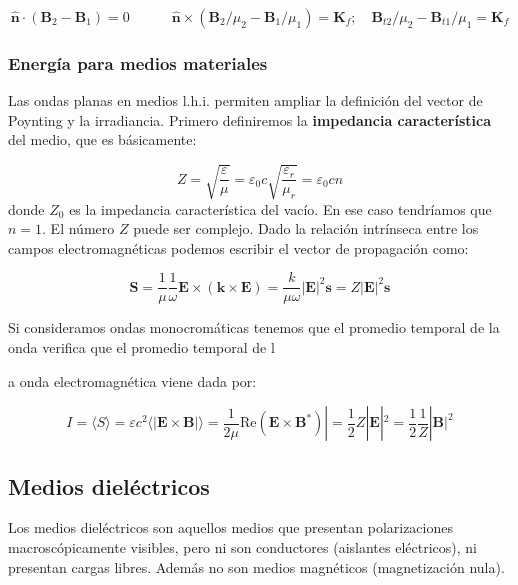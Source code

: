 \documentclass[12pt]{article}
\newcommand{\Real}{\mathrm{Re}}
\newcommand{\tquad}{\quad \quad \quad}
\newcommand{\Bn}{\mathbf{B}}
\newcommand{\En}{\mathbf{E}}
\newcommand{\kn}{\mathbf{k}}
\newcommand{\Kn}{\mathbf{K}}
\newcommand{\Sn}{\mathbf{S}}
\newcommand{\sn}{\mathbf{s}}
\newcommand{\hnn}{\hat{\mathbf{n}}}
\numberwithin{equation}{section}
\numberwithin{figure}{section}
\begin{document}
\begin{equation}
\hnn \cdot (\Bn_2-\Bn_1)=0  \tquad \hnn \times (\Bn_2 / \mu_2 - \Bn_1 / \mu_1) = \Kn_f; \quad \Bn_{t2} / \mu_2 - \Bn_{t1} / \mu_1 = \Kn_f 
\end{equation}



\subsubsection{Energía para medios materiales}

Las ondas planas en medios l.h.i. permiten ampliar la definición del vector de Poynting y la irradiancia. Primero definiremos la \textbf{impedancia característica} del medio, que es básicamente:

\begin{equation}
Z = \sqrt{\dfrac{\varepsilon}{\mu}} = \varepsilon_0 c \sqrt{\frac{\varepsilon_r}{\mu_r}}= \varepsilon_0 c n
\end{equation}
donde $Z_0$ es la impedancia característica del vacío. En ese caso tendríamos que $n=1$. El número $Z$ puede ser complejo. Dado la relación intrínseca entre los campos electromagnéticas podemos escribir el vector de propagación como:

\begin{equation}
\Sn = \dfrac{1}{\mu} \dfrac{1}{\omega} \En \times ( \kn \times  \En ) = \dfrac{k}{ \mu \omega} | \En |^2 \sn  = Z |\En| ^2 \sn
\end{equation}

Si consideramos ondas monocromáticas tenemos que el promedio temporal de la onda verifica que el promedio temporal de l

a onda electromagnética viene dada por:

\begin{equation}
I = \langle S \rangle = \varepsilon c^2 \langle | \En \times \Bn | \rangle = \dfrac{1}{2 \mu} \Real ( \En \times \Bn^*)| = \dfrac{1}{2}  Z |\En|^2 = \dfrac{1}{2} \dfrac{1}{Z} |\Bn|^2 \label{Ec:5.1.5.013-Irradiancia}
\end{equation}

\subsection{Medios dieléctricos}

Los medios dieléctricos son aquellos medios que presentan polarizaciones macroscópicamente visibles, pero ni son conductores (aislantes eléctricos), ni presentan cargas libres. Además no son medios magnéticos (magnetización nula). \\
\end{document}
